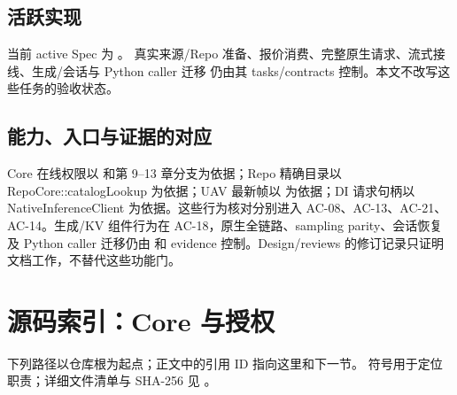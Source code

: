 \subsection{活跃实现}
当前 active Spec 为 。
真实来源/Repo 准备、报价消费、完整原生请求、流式接线、生成/会话与 Python caller 迁移
仍由其 tasks/contracts 控制。本文不改写这些任务的验收状态。



\subsection{能力、入口与证据的对应}
Core 在线权限以  和第 9–13 章分支为依据；Repo 精确目录以 RepoCore::catalogLookup 为依据；UAV 最新帧以  为依据；DI 请求句柄以 NativeInferenceClient 为依据。这些行为核对分别进入 AC-08、AC-13、AC-21、AC-14。生成/KV 组件行为在 AC-18，原生全链路、sampling parity、会话恢复及 Python caller 迁移仍由  和 evidence 控制。Design/reviews 的修订记录只证明文档工作，不替代这些功能门。

\newpage

\section{源码索引：Core 与授权}
下列路径以仓库根为起点；正文中的引用 ID 指向这里和下一节。
符号用于定位职责；详细文件清单与 SHA-256 见 。

